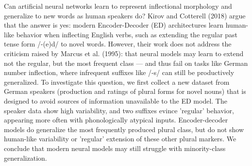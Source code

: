 Can artificial  neural  networks  learn  to  represent  inflectional  morphology  and  generalize to new words as human speakers do?   Kirov and Cotterell (2018) argue that the answer is yes:  modern Encoder-Decoder (ED) architectures learn human-like behavior when inflecting English verbs,  such as extending the regular  past  tense  form  /-(e)d/  to  novel  words. However, their work does not address the criticism raised by Marcus et al. (1995): that neural models may learn to extend not the regular, but the most frequent class — and thus fail on tasks like German number inflection, where infrequent suffixes like /-s/ can still be productively generalized. To investigate this question, we first collect a new dataset from German speakers (production and ratings of plural forms for novel nouns) that  is designed to avoid sources of information unavailable to the ED model. The speaker data show high variability, and two suffixes evince 'regular' behavior, appearing more often with phonologically atypical inputs. Encoder-decoder models do generalize the most frequently produced plural class, but do not show human-like variability or  'regular' extension of these other plural markers. We conclude that  modern neural models may still struggle with minority-class generalization.
